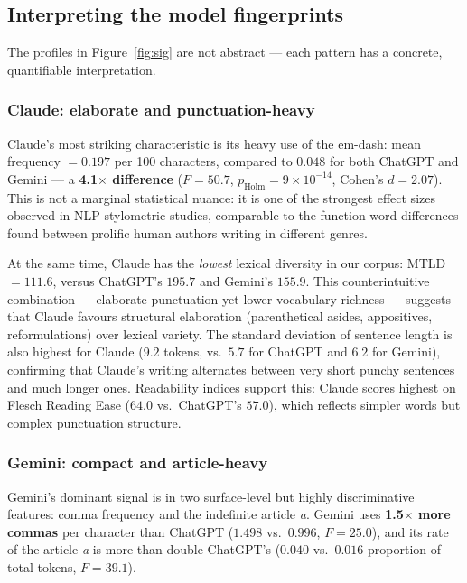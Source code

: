 \documentclass[11pt,a4paper]{article}
\begin{document}
\subsection{Interpreting the model fingerprints}
\label{sec:profiles}

The profiles in Figure~\ref{fig:sig} are not abstract --- each
pattern has a concrete, quantifiable interpretation.

\subsubsection*{Claude: elaborate and punctuation-heavy}

Claude's most striking characteristic is its heavy use of the
em-dash: mean frequency $= 0.197$ per 100 characters, compared to
$0.048$ for both ChatGPT and Gemini --- a \textbf{4.1$\times$
difference} ($F = 50.7$, $p_\text{Holm} = 9 \times 10^{-14}$,
Cohen's $d = 2.07$). This is not a marginal statistical nuance: it
is one of the strongest effect sizes observed in NLP stylometric
studies, comparable to the function-word differences found between
prolific human authors writing in different genres.

At the same time, Claude has the \emph{lowest} lexical diversity
in our corpus: MTLD $= 111.6$, versus ChatGPT's $195.7$ and
Gemini's $155.9$. This counterintuitive combination --- elaborate
punctuation yet lower vocabulary richness --- suggests that Claude
favours structural elaboration (parenthetical asides, appositives,
reformulations) over lexical variety. The standard deviation of
sentence length is also highest for Claude ($9.2$ tokens, vs.\
$5.7$ for ChatGPT and $6.2$ for Gemini), confirming that Claude's
writing alternates between very short punchy sentences and much
longer ones. Readability indices support this: Claude scores highest
on Flesch Reading Ease ($64.0$ vs.\ ChatGPT's $57.0$), which
reflects simpler words but complex punctuation structure.

\subsubsection*{Gemini: compact and article-heavy}

Gemini's dominant signal is in two surface-level but highly
discriminative features: comma frequency and the indefinite article
\textit{a}. Gemini uses \textbf{1.5$\times$ more commas} per
character than ChatGPT ($1.498$ vs.\ $0.996$, $F = 25.0$), and its
rate of the article \textit{a} is more than double ChatGPT's
($0.040$ vs.\ $0.016$ proportion of total tokens, $F = 39.1$).
\end{document}
